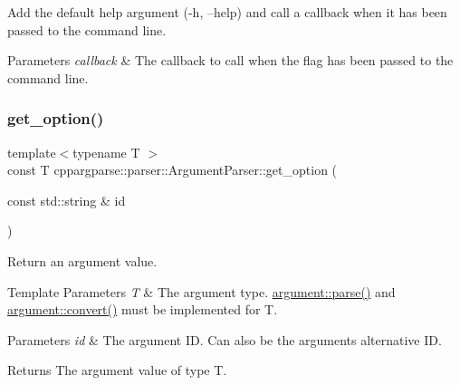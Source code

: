 Add the default help argument (-\/h, --help) and call a callback when it has been passed to the command line. 


\begin{DoxyParams}{Parameters}
{\em callback} & The callback to call when the flag has been passed to the command line. \\
\hline
\end{DoxyParams}
\mbox{\label{classcppargparse_1_1parser_1_1ArgumentParser_a3e8d3ae0eece40b7e62ae6faae5107ed}} 
\subsubsection{\texorpdfstring{get\+\_\+option()}{get\_option()}\hspace{0.1cm}{\footnotesize\ttfamily [1/2]}}
{\footnotesize\ttfamily template$<$typename T $>$ \\
const T cppargparse\+::parser\+::\+Argument\+Parser\+::get\+\_\+option (\begin{DoxyParamCaption}\item[{const std\+::string \&}]{id }\end{DoxyParamCaption})\hspace{0.3cm}{\ttfamily [inline]}}



Return an argument value. 


\begin{DoxyTemplParams}{Template Parameters}
{\em T} & The argument type. \hyperlink{structcppargparse_1_1argument_a9b5feac6fe8cf18beb63d85c0840cd84}{argument\+::parse()} and \hyperlink{structcppargparse_1_1argument_a2051f71ef4ed0b9d299cc58bb494e42b}{argument\+::convert()} must be implemented for T.\\
\hline
\end{DoxyTemplParams}

\begin{DoxyParams}{Parameters}
{\em id} & The argument ID. Can also be the argument\textquotesingle{}s alternative ID.\\
\hline
\end{DoxyParams}
\begin{DoxyReturn}{Returns}
The argument value of type T. 
\end{DoxyReturn}

